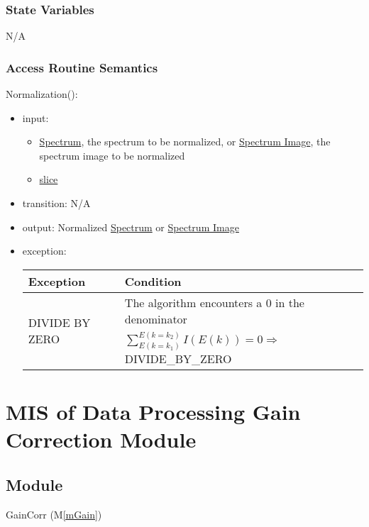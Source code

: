 \documentclass[12pt, titlepage]{article}
\newcommand{\mref}[1]{M\ref{#1}}
\begin{document}
\subsubsection{State Variables}
N/A

\subsubsection{Access Routine Semantics}

\noindent Normalization():
\begin{itemize}
    \item input: 
    \begin{itemize}
        \item \hyperref[Mod:Spectrum]{Spectrum}, the spectrum to be normalized,
        or \hyperref[Mod:SI]{Spectrum Image}, the spectrum image to be normalized
        \item \hyperref[Mod:Slice1D]{slice}
    \end{itemize}
    \item transition: N/A
    \item output: Normalized \hyperref[Mod:Spectrum]{Spectrum} or
    \hyperref[Mod:SI]{Spectrum Image}
    \item exception:
    \begin{center}
        \begin{tabular}{p{3.5cm} p{12cm}}
            \toprule[0.15em]
            \textbf{Exception} & \textbf{Condition}\\
            \midrule[0.1em]
            \multirow{2}{0.25\textwidth}{DIVIDE BY ZERO} & The algorithm
            encounters a 0 in the denominator\\ 
            & $\sum_{E(k=k_1)}^{E(k=k_2)}{I(E(k))} = 0 \Rightarrow$
            DIVIDE\_BY\_ZERO\\ 
            \bottomrule[0.15em]
        \end{tabular}
    \end{center}
\end{itemize}

\newpage
\section{MIS of Data Processing Gain Correction Module} \label{Mod:GainCorr}

\subsection{Module}
GainCorr (\mref{mGain})
\end{document}
